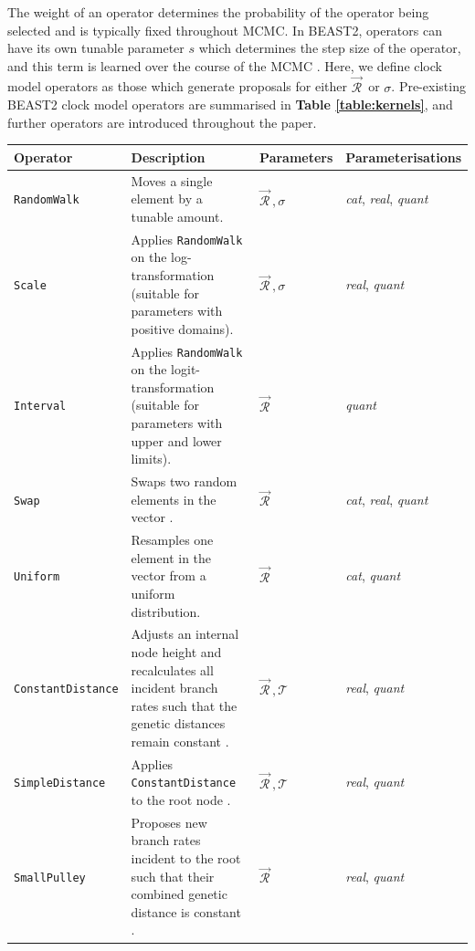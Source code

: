 \documentclass[10pt,letterpaper]{article}
\begin{document}
The weight of an operator determines the probability of the operator being selected and is typically fixed throughout MCMC.
In BEAST2, operators can have its own tunable parameter $s$ which determines the step size of the operator, and this term is learned over the course of the MCMC \cite{bouckaert2019beast}. 
Here, we define clock model operators as those which generate proposals for either $\vec{\mathcal{R}}^{\,}$ or $\sigma$.
Pre-existing BEAST2 clock model operators are summarised in \textbf{Table \ref{table:kernels}}, and further operators are introduced throughout the paper.


\begin{table}[h!]
\centering
\begin{tabular}{l p{4.2cm} l l} 
 Operator & Description & Parameters & Parameterisations  \\
  \hline
 \texttt{RandomWalk} & Moves a single element by a tunable amount. & $\vec{\mathcal{R}}^{\,}, \sigma$ & \textit{cat}, \textit{real}, \textit{quant} \\
  \hline
\texttt{Scale} & Applies \texttt{RandomWalk} on the log-transformation (suitable for parameters with positive domains). & $\vec{\mathcal{R}}^{\,}, \sigma$ & \textit{real}, \textit{quant}  \\
  \hline
 \texttt{Interval} & Applies \texttt{RandomWalk} on the logit-transformation (suitable for parameters with upper and lower limits). & $\vec{\mathcal{R}}^{\,}$ & \textit{quant}  \\
  \hline
 \texttt{Swap} & Swaps two random elements in the vector \cite{drummond2006relaxed}. & $\vec{\mathcal{R}}^{\,}$  & \textit{cat}, \textit{real}, \textit{quant}  \\
 \hline
\texttt{Uniform} & Resamples one element in the vector from a uniform distribution. & $\vec{\mathcal{R}}^{\,}$  & \textit{cat}, \textit{quant}  \\
 \hline
\texttt{ConstantDistance} & Adjusts an internal node height and recalculates all incident branch rates such that the genetic distances remain constant \cite{zhang2020improving}.  & $\vec{\mathcal{R}}^{\,}, \mathcal{T}$ & \textit{real}, \textit{quant} \\
 \hline
\texttt{SimpleDistance} & Applies \texttt{ConstantDistance} to the root node \cite{zhang2020improving}.  & $\vec{\mathcal{R}}^{\,}, \mathcal{T}$ & \textit{real}, \textit{quant} \\
 \hline
\texttt{SmallPulley} & Proposes new branch rates incident to the root such that their combined genetic distance is constant  \cite{zhang2020improving}.  & $\vec{\mathcal{R}}^{\,}$ & \textit{real}, \textit{quant} \\

\end{tabular}
\end{table}
\end{document}
